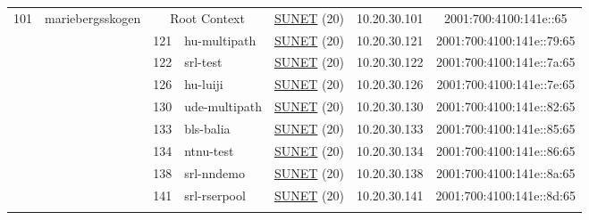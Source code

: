 \begin{small}
\begin{center}
\begin{longtable}{|c|c|c|c|c|c|c|c|}
 \multirow{15}{*}{\tiny{101}} & \multicolumn{1}{|l|}{\multirow{15}{*}{\tiny{mariebergsskogen}}} & \multicolumn{2}{|c|}{\tiny{Root Context}} & \multicolumn{2}{|c|}{\tiny{\href{http://www.sunet.se}{SUNET} (20)}} & \tiny{10.20.30.101} & \tiny{2001:700:4100:141e::65} \\* \cline{3-3}\cline{4-4}\cline{5-5}\cline{6-6}\cline{7-7}\cline{8-8}
  &  & \tiny{121} & \multicolumn{1}{|l|}{\tiny{hu-multipath}} & \multicolumn{2}{|c|}{\tiny{\href{http://www.sunet.se}{SUNET} (20)}} & \tiny{10.20.30.121} & \tiny{2001:700:4100:141e::79:65} \\* \cline{3-3}\cline{4-4}\cline{5-5}\cline{6-6}\cline{7-7}\cline{8-8}
  &  & \tiny{122} & \multicolumn{1}{|l|}{\tiny{srl-test}} & \multicolumn{2}{|c|}{\tiny{\href{http://www.sunet.se}{SUNET} (20)}} & \tiny{10.20.30.122} & \tiny{2001:700:4100:141e::7a:65} \\* \cline{3-3}\cline{4-4}\cline{5-5}\cline{6-6}\cline{7-7}\cline{8-8}
  &  & \tiny{126} & \multicolumn{1}{|l|}{\tiny{hu-luiji}} & \multicolumn{2}{|c|}{\tiny{\href{http://www.sunet.se}{SUNET} (20)}} & \tiny{10.20.30.126} & \tiny{2001:700:4100:141e::7e:65} \\* \cline{3-3}\cline{4-4}\cline{5-5}\cline{6-6}\cline{7-7}\cline{8-8}
  &  & \tiny{130} & \multicolumn{1}{|l|}{\tiny{ude-multipath}} & \multicolumn{2}{|c|}{\tiny{\href{http://www.sunet.se}{SUNET} (20)}} & \tiny{10.20.30.130} & \tiny{2001:700:4100:141e::82:65} \\* \cline{3-3}\cline{4-4}\cline{5-5}\cline{6-6}\cline{7-7}\cline{8-8}
  &  & \tiny{133} & \multicolumn{1}{|l|}{\tiny{bls-balia}} & \multicolumn{2}{|c|}{\tiny{\href{http://www.sunet.se}{SUNET} (20)}} & \tiny{10.20.30.133} & \tiny{2001:700:4100:141e::85:65} \\* \cline{3-3}\cline{4-4}\cline{5-5}\cline{6-6}\cline{7-7}\cline{8-8}
  &  & \tiny{134} & \multicolumn{1}{|l|}{\tiny{ntnu-test}} & \multicolumn{2}{|c|}{\tiny{\href{http://www.sunet.se}{SUNET} (20)}} & \tiny{10.20.30.134} & \tiny{2001:700:4100:141e::86:65} \\* \cline{3-3}\cline{4-4}\cline{5-5}\cline{6-6}\cline{7-7}\cline{8-8}
  &  & \tiny{138} & \multicolumn{1}{|l|}{\tiny{srl-nndemo}} & \multicolumn{2}{|c|}{\tiny{\href{http://www.sunet.se}{SUNET} (20)}} & \tiny{10.20.30.138} & \tiny{2001:700:4100:141e::8a:65} \\* \cline{3-3}\cline{4-4}\cline{5-5}\cline{6-6}\cline{7-7}\cline{8-8}
  &  & \tiny{141} & \multicolumn{1}{|l|}{\tiny{srl-rserpool}} & \multicolumn{2}{|c|}{\tiny{\href{http://www.sunet.se}{SUNET} (20)}} & \tiny{10.20.30.141} & \tiny{2001:700:4100:141e::8d:65} \\* \cline{3-3}\cline{4-4}\cline{5-5}\cline{6-6}\cline{7-7}\cline{8-8}

\end{longtable}
\end{center}
\end{small}
